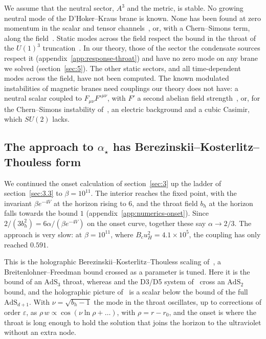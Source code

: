 We assume that the neutral sector, $A^3$ and the metric, is stable. No
growing neutral mode of the D'Hoker--Kraus brane is known. None has been
found at zero momentum in the scalar and tensor
channels~\cite{Janiszewski:2015ura,Shah:2024lym}, or, with a Chern--Simons
term, along the field~\cite{Ammon:2017ded}. Static modes across the field
respect the bound in the throat of the $U(1)^3$
truncation~\cite{Donos:2011pn}. In our theory, those of the sector the
condensate sources respect it (appendix~\ref{app:response-throat}) and have
no zero mode on any brane we solved (section~\ref{sec:5}). The other static
sectors, and all time-dependent modes across the field, have not been
computed. The known modulated instabilities of
magnetic branes need couplings our theory does not have: a neutral scalar
coupled to $F_{\mu\nu}F'^{\mu\nu}$, with $F'$ a second abelian field
strength~\cite{Donos:2011qt,Donos:2016hsd}, or, for the Chern--Simons
instability of~\cite{Nakamura:2009tf}, an electric background and a cubic
Casimir, which $SU(2)$ lacks.

\subsection{The approach to \texorpdfstring{$\alpha_\star$}{alpha*} has Berezinskii--Kosterlitz--Thouless form}
\label{sec:4.6}

We continued the onset calculation of section~\ref{sec:3} up the ladder of
section~\ref{sec:3.3} to $\beta = 10^{11}$. The interior reaches
the fixed point, with the invariant $\beta e^{-4V}$ at the horizon rising to
$6$, and the throat field $b_h$ at the horizon falls towards the bound
$1$ (appendix~\ref{app:numerics-onset}). Since
$2/(3b_h^2) = 6\alpha/(\beta e^{-4V})$ on the onset curve, together these
say $\alpha \to 2/3$. The approach is very slow: at $\beta = 10^{11}$,
where $B_c u_H^2 = 4.1 \times 10^5$, the coupling has only reached $0.591$.

This is the holographic Berezinskii--Kosterlitz--Thouless scaling
of~\cite{Kaplan:2009kr,Jensen:2010ga,Iqbal:2010eh,Jensen:2010vx,Evans:2010hi},
a Breitenlohner--Freedman bound crossed as a parameter is tuned. Here it
is the bound of an $\mathrm{AdS}_3$ throat, whereas
\cite{Iqbal:2010eh,Jensen:2010vx,Evans:2010hi} and the D3/D5 system
of~\cite{Jensen:2010ga} cross an $\mathrm{AdS}_2$ bound, and the holographic picture
of~\cite{Kaplan:2009kr} is a scalar below the bound of the full
$\mathrm{AdS}_{d+1}$. With $\nu = \sqrt{b_h - 1}$ the mode in the throat oscillates, up to
corrections of order $\varepsilon$, as
$\rho\,w \propto \cos(\nu\ln\rho + \ldots)$, with $\rho = r - r_0$, and the
onset is where the throat is long enough to hold the solution that joins
the horizon to the ultraviolet without an extra node.

